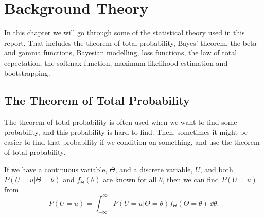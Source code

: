 \newpage
\chapter{Background Theory}
In this chapter we will go through some of the statistical theory used in this report. That includes the theorem of total probability, Bayes' theorem, the beta and gamma functions, Bayesian modelling, loss functions, the law of total ecpectation, the softmax function, maximum likelihood estimation and bootstrapping.  

\section{The Theorem of Total Probability}
The theorem of total probability is often used when we want to find some probability, and this probability is hard to find. Then, sometimes it might be easier to find that probability if we condition on something, and use the theorem of total probability. 
\begin{theorem}
If we have a continuous variable, $\Theta$, and a discrete variable, $U$, and both $P(U=u|\Theta=\theta)$ and  $f_\Theta(\theta)$ are known for all $\theta$, then we can find $P(U=u)$ from \citep{schay2016introduction} 
\begin{equation}
    \label{lawoftotprob}
    P(U=u) = \int_{-\infty}^{\infty} P(U=u|\Theta=\theta)f_{\Theta}(\Theta=\theta) \: \dd \theta.
\end{equation}
\end{theorem}

\begin{comment}
In \citet{schay2016introduction}, the theorem of total probability for continuous variables is stated as 
\begin{theorem}[Theorem of Total Probability, Continuous Versions]
 For a continuous random variable Y and any event A, if $f_{Y|A}$ and $f_Y$ exists for all y, then
\begin{equation}
    P(A) = \int_{-\infty}^{\infty}
    P(A|Y=y)f_Y(y) dy.
\end{equation}
\end{theorem}
\end{comment}




